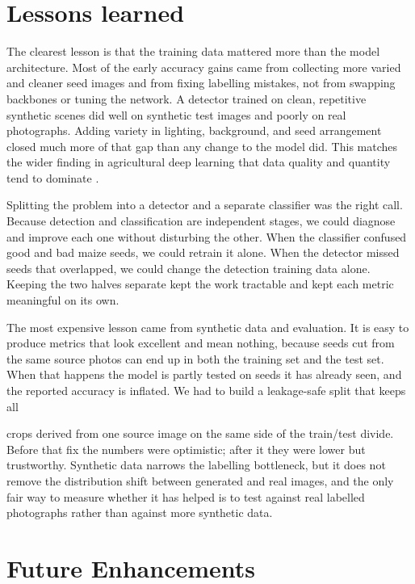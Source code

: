 \section{Lessons learned}

The clearest lesson is that the training data mattered more than the model
architecture. Most of the early accuracy gains came from collecting more varied
and cleaner seed images and from fixing labelling mistakes, not from swapping
backbones or tuning the network. A detector trained on clean, repetitive
synthetic scenes did well on synthetic test images and poorly on real
photographs. Adding variety in lighting, background, and seed arrangement closed
much more of that gap than any change to the model did. This matches the wider
finding in agricultural deep learning that data quality and quantity tend to
dominate \cite{kamilaris2018deepag, mohanty2016plant}.

Splitting the problem into a detector and a separate classifier was the right
call. Because detection and classification are independent stages, we could
diagnose and improve each one without disturbing the other. When the classifier
confused good and bad maize seeds, we could retrain it alone. When the detector
missed seeds that overlapped, we could change the detection training data alone.
Keeping the two halves separate kept the work tractable and kept each metric
meaningful on its own.

The most expensive lesson came from synthetic data and evaluation. It is easy to
produce metrics that look excellent and mean nothing, because seeds cut from the
same source photos can end up in both the training set and the test set. When
that happens the model is partly tested on seeds it has already seen, and the
reported accuracy is inflated. We had to build a leakage-safe split that keeps all

crops derived from one source image on the same side of the train/test divide.
Before that fix the numbers were optimistic; after it they were lower but
trustworthy. Synthetic data narrows the labelling bottleneck, but it does not
remove the distribution shift between generated and real images, and the only
fair way to measure whether it has helped is to test against real labelled
photographs rather than against more synthetic data.

\section{Future Enhancements}
\label{sec:ch7-future}

